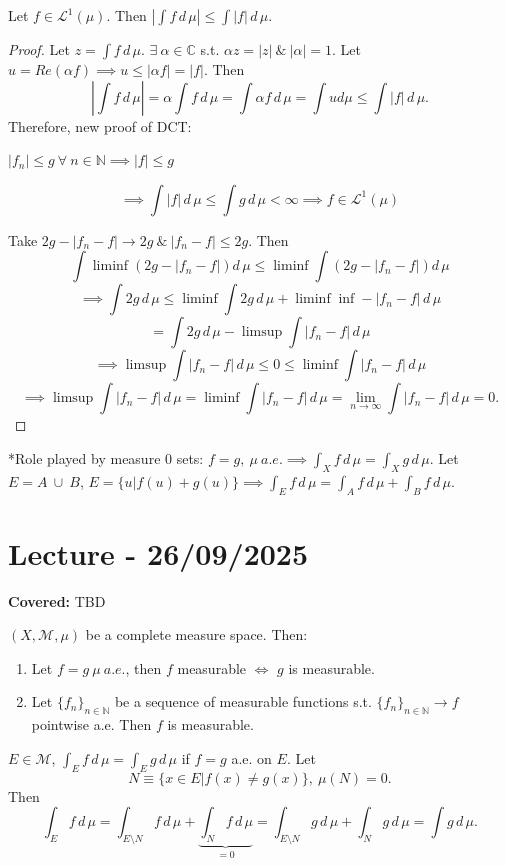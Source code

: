 \documentclass{functionspaces}
\begin{document}
\begin{proposition}\label{prop:integral_norm}
Let $f\in\mathcal{L}^{1}(\mu).$ Then $\left|\int f\,d\,\mu\right|\leq\int|f|\,d\,\mu$.
\end{proposition}

\begin{proof}
Let $z=\int f\,d\,\mu$. $\exists\ \alpha\in\mathbb{C}$ s.t. $\alpha z=|z|\ \&\ |\alpha|=1.$ Let $u=Re(\alpha f)\implies u\leq|\alpha f|=|f|$. Then
\[
\left|\int f\,d\,\mu\right|=\alpha\int f\,d\,\mu=\int\alpha f\,d\,\mu=\int ud\mu\leq\int|f|\,d\,\mu.
\]
Therefore, new proof of DCT:

$|f_{n}|\leq g\ \forall\ n\in\mathbb{N}\implies|f|\leq g$

\[
\implies\int|f|\,d\,\mu\leq\int g\,d\,\mu<\infty\implies f\in\mathcal{L}^{1}(\mu)
\]

Take $2g-|f_{n}-f|\to 2g\ \&\ |f_{n}-f|\leq 2g$. Then
\[
\int\liminf(2g-|f_{n}-f|)d\,\mu \leq\liminf\int(2g-|f_{n}-f|)d\,\mu
\]
\[
\implies\int 2g\,d\,\mu\leq\liminf\int 2g\,d\,\mu+\liminf\inf-|f_{n}-f|\,d\,\mu
\]
\[
=\int 2g\,d\,\mu-\limsup\int|f_{n}-f|\,d\,\mu
\]
\[
\implies\limsup\int|f_{n}-f|\,d\,\mu\leq 0\leq\liminf\int|f_{n}-f|\,d\,\mu
\]
\[
\implies\limsup\int|f_{n}-f|\,d\,\mu=\liminf\int|f_{n}-f|\,d\,\mu=\lim_{n\to\infty}\int|f_{n}-f|\,d\,\mu=0.
\]
\end{proof}

*Role played by measure $0$ sets: $f=g,\ \mu\ a.e.\implies\int_{X}f\,d\,\mu=\int_{X}g\,d\,\mu.$ Let $E=A\ \cup\ B$, $E=\{u|f(u)+g(u)\}\implies\int_{E}f\,d\,\mu=\int_{A}f\,d\,\mu+\int_{B}f\,d\,\mu$.

\setlength{\parindent}{0pt}
\endgroup

\newpage
\section{Lecture - 26/09/2025}

\textbf{Covered:} TBD

\begingroup
\setlength{\parskip}{6pt}

\begin{proposition}\label{prop:complete_measure_props}
$(X,\mathcal{M},\mu)$ be a complete measure space. Then:
\begin{enumerate}
\item Let $f=g\ \mu\ a.e.$, then $f$ measurable $\iff$ $g$ is measurable.
\item Let $\{f_{n}\}_{n\in\mathbb{N}}$ be a sequence of measurable functions s.t. $\{f_{n}\}_{n\in\mathbb{N}}\to f$ pointwise a.e. Then $f$ is measurable.
\end{enumerate}
$E\in\mathcal{M}$, $\int_{E}f\,d\,\mu=\int_{E}g\,d\,\mu$ if $f=g$ a.e. on $E$. Let
\[
N\equiv\{x\in E|f(x)\neq g(x)\},\ \mu(N)=0.
\]
Then
\[
\int_{E}f\,d\,\mu=\int_{E\setminus N}f\,d\,\mu+\underbrace{\int_{N}f\,d\,\mu}_{=0}=\int_{E\setminus N}g\,d\,\mu+\int_{N}g\,d\,\mu=\int g\,d\,\mu.
\]
\end{proposition}
\end{document}
